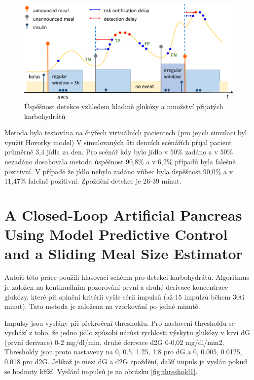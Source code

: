 \begin{figure}[H]
\caption{Úspěšnost detekce vzhledem hladině glukózy a množství přijatých karbohydrátů}
\label{fig:forest}
\includegraphics[width=1\textwidth]{img/analyza/forest.png}
\end{figure}

Metoda byla testována na čtyřech virtuálních pacientech (pro jejich simulaci byl využit Hovorky model) V simulovaných 5ti denních scénářích přijal pacient průměrně 3,4 jídla za den. Pro scénář kdy bylo jídlo v 50\% zadáno a v 50\% nezadáno dosahovala metoda úspěšnost 90,8\% a v 6,2\% případů byla falešně pozitivní. V případě že jídlo nebylo zadáno vůbec byla úspěšnost 90,0\% a v 11,47\% falešně pozitivní. Zpoždění detekce je 26-39 minut.


\section{A Closed-Loop Artificial Pancreas Using Model Predictive Control and a Sliding Meal Size Estimator \citep{Analyza.Thresholds}}
\label{ch:thrashold}

Autoři této práce použili hlasovací schéma pro detekci karbohydrátů. Algoritmus je založen na kontinuálním  pozorování první a druhé derivace koncentrace glukózy, které při splnění kritérii vyšle sérii impulsů (až 15 impulzů během 30ti minut). Tato metoda je založena na vzorkování po jedné minutě.

 Impulsy jsou vyslány při překročení thresholdu. Pro nastavení thresholdu se vychází z toho, že jedno jídlo způsobí nárůst rychlosti výskytu glukózy v krvi dG (první derivace) 0-2 mg/dl/min, druhé derivace d2G 0-0,02 mg/dl/min2. Thresholdy jsou proto nastaveny na {0, 0.5, 1.25, 1.8} pro dG a {0, 0.005, 0.0125, 0.018} pro d2G. Jelikož je mezi dG a d2G zpoždění, další impuls je vyslán pokud se hodnoty kříží. Vyslání impulsů je na obrázku \ref{fig:threshold1}.
 
